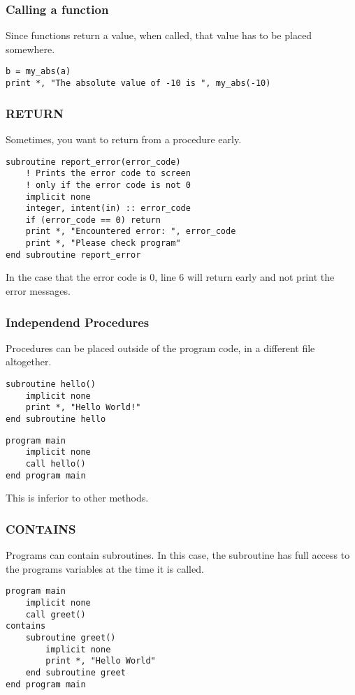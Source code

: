 \begin{frame}[fragile]
  \frametitle{Calling a function}

  Since functions return a value, when called, that value
  has to be placed somewhere.

  \begin{lstlisting}[numbers=none]
b = my_abs(a)
print *, "The absolute value of -10 is ", my_abs(-10)
  \end{lstlisting}

\end{frame}

\begin{frame}[fragile]
  \frametitle{RETURN}

  Sometimes, you want to return from a procedure early.

  \begin{lstlisting}
subroutine report_error(error_code)
    ! Prints the error code to screen
    ! only if the error code is not 0
    implicit none
    integer, intent(in) :: error_code
    if (error_code == 0) return
    print *, "Encountered error: ", error_code
    print *, "Please check program"
end subroutine report_error
  \end{lstlisting}

  In the case that the error code is 0, line 6 will return early and not print
  the error messages.
\end{frame}

\begin{frame}[fragile]
  \frametitle{Independend Procedures}

  Procedures can be placed outside of the program code, in a different file altogether.

  \begin{lstlisting}
subroutine hello()
    implicit none
    print *, "Hello World!"
end subroutine hello
  \end{lstlisting}

  \begin{lstlisting}
program main
    implicit none
    call hello()
end program main
  \end{lstlisting}

This is inferior to other methods.

\end{frame}

\begin{frame}[fragile]
  \frametitle{CONTAINS}

Programs can contain subroutines.
In this case, the subroutine has full access to the programs variables at the time
it is called.

  \begin{lstlisting}
program main
    implicit none
    call greet()
contains
    subroutine greet()
        implicit none
        print *, "Hello World"
    end subroutine greet
end program main
  \end{lstlisting}

\end{frame}

